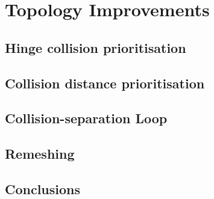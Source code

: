 \chapter{Topology Improvements}
\label{c:topology}
\section{Hinge collision prioritisation}
\section{Collision distance prioritisation}
\section{Collision-separation Loop}
\section{Remeshing}
\section{Conclusions}
\savearabiccounter
